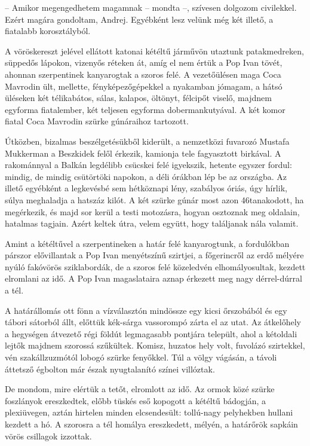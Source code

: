 \documentclass{IEEEtran}
\begin{document}
– Amikor megengedhetem magamnak – mondta –, szívesen dolgozom civilekkel.
Ezért magára gondoltam, Andrej. Egyébként lesz velünk még két illető, a
fiatalabb korosztályból.

A vöröskereszt jelével ellátott katonai kétéltű járművön utaztunk
patakmedreken, süppedős lápokon, vizenyős réteken át, amíg el nem értük a Pop
Ivan tövét, ahonnan szerpentinek kanyarogtak a szoros felé. A vezetőülésen
maga Coca Mavrodin ült, mellette, fényképezőgépekkel a nyakamban jómagam, a
hátsó üléseken két télikabátos, sálas, kalapos, öltönyt, félcipőt viselő,
majdnem egyforma fiatalember, két teljesen egyforma dobermankutyával. A két
komor fiatal Coca Mavrodin szürke gúnáraihoz tartozott.

Útközben, bizalmas beszélgetésükből kiderült, a nemzetközi fuvarozó Mustafa
Mukkerman a Beszkidek felől érkezik, kamionja tele fagyasztott birkával. A
rakománnyal a Balkán legdélibb csücskei felé igyekszik, hetente egyszer
fordul: mindig, de mindig csütörtöki napokon, a déli órákban lép be az
országba. Az illető egyébként a legkevésbé sem hétköznapi lény, szabályos
óriás, úgy hírlik, súlya meghaladja a hatszáz kilót. A két szürke gúnár most
azon 46tanakodott, ha megérkezik, és majd sor kerül a testi motozásra, hogyan
osztoznak meg oldalain, hatalmas tagjain. Azért keltek útra, velem együtt,
hogy találjanak nála valamit.

Amint a kétéltűvel a szerpentineken a határ felé kanyarogtunk, a fordulókban
párszor elővillantak a Pop Ivan menyétszínű szirtjei, a főgerincről az erdő
mélyére nyúló fakóvörös sziklabordák, de a szoros felé közeledvén
elhomályosultak, kezdett elromlani az idő. A Pop Ivan magaslataira aznap
érkezett meg nagy dérrel-dúrral a tél.

A határállomás ott fönn a vízválasztón mindössze egy kicsi őrszobából és egy
tábori sátorból állt, előttük kék-sárga vassorompó zárta el az utat. Az
átkelőhely a hegységen átvezető régi földút legmagasabb pontjára települt,
ahol a kétoldali lejtők majdnem szorossá szűkültek. Komisz, huzatos hely volt,
fuvolázó szirtekkel, vén szakállzuzmótól lobogó szürke fenyőkkel. Túl a völgy
vágásán, a távoli áttetsző égbolton már észak nyugtalanító színei villóztak.

De mondom, mire elértük a tetőt, elromlott az idő. Az ormok közé szürke
foszlányok ereszkedtek, előbb tüskés eső kopogott a kétéltű bádogján, a
plexiüvegen, aztán hirtelen minden elcsendesült: tollú-nagy pelyhekben hullani
kezdett a hó. A szorosra a tél homálya ereszkedett, mélyén, a határőrök
sapkáin vörös csillagok izzottak.
\end{document}

